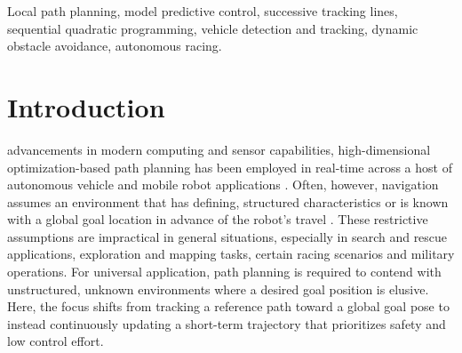 \documentclass[journal]{IEEEtran}
\begin{document}
\begin{IEEEkeywords}
Local path planning, model predictive control, successive tracking lines, sequential quadratic programming, vehicle detection and tracking, dynamic obstacle avoidance, autonomous racing.
\end{IEEEkeywords}

\section{Introduction}

 advancements in modern computing and sensor capabilities, high-dimensional optimization-based path planning has been employed in real-time across a host of autonomous vehicle and mobile robot applications \cite{Yu2021}. Often, however, navigation assumes an environment that has defining, structured characteristics \cite{Ji2017,Falcone2007} or is known with a global goal location in advance of the robot's travel \cite{Alshammrei2022}. These restrictive assumptions are impractical in general situations, especially in search and rescue applications, exploration and mapping tasks, certain racing scenarios and military operations. For universal application, path planning is required to contend with unstructured, unknown environments where a desired goal position is elusive. Here, the focus shifts from tracking a reference path toward a global goal pose to instead continuously updating a short-term trajectory that prioritizes safety and low control effort.

\end{document}
